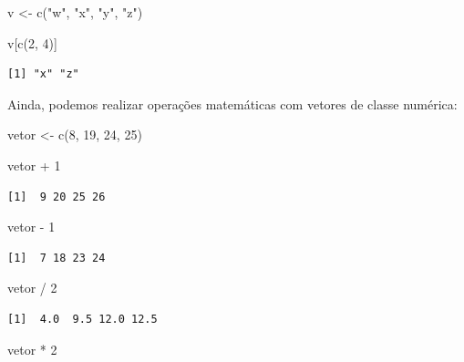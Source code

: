 \documentclass[
  brazilian,
]{book}
\newenvironment{Shaded}{\begin{snugshade}}{\end{snugshade}}
\newcommand{\DecValTok}[1]{\textcolor[rgb]{0.00,0.00,0.81}{#1}}
\newcommand{\FunctionTok}[1]{\textcolor[rgb]{0.00,0.00,0.00}{#1}}
\newcommand{\NormalTok}[1]{#1}
\newcommand{\OtherTok}[1]{\textcolor[rgb]{0.56,0.35,0.01}{#1}}
\newcommand{\SpecialCharTok}[1]{\textcolor[rgb]{0.00,0.00,0.00}{#1}}
\newcommand{\StringTok}[1]{\textcolor[rgb]{0.31,0.60,0.02}{#1}}
\begin{document}
\begin{Shaded}
\begin{Highlighting}[]
\NormalTok{v }\OtherTok{\textless{}{-}} \FunctionTok{c}\NormalTok{(}\StringTok{"w"}\NormalTok{, }\StringTok{"x"}\NormalTok{, }\StringTok{"y"}\NormalTok{, }\StringTok{"z"}\NormalTok{)}

\NormalTok{v[}\FunctionTok{c}\NormalTok{(}\DecValTok{2}\NormalTok{, }\DecValTok{4}\NormalTok{)]}
\end{Highlighting}
\end{Shaded}

\begin{verbatim}
[1] "x" "z"
\end{verbatim}

Ainda, podemos realizar operações matemáticas com vetores de classe numérica:

\begin{Shaded}
\begin{Highlighting}[]
\NormalTok{vetor }\OtherTok{\textless{}{-}} \FunctionTok{c}\NormalTok{(}\DecValTok{8}\NormalTok{, }\DecValTok{19}\NormalTok{, }\DecValTok{24}\NormalTok{, }\DecValTok{25}\NormalTok{)}

\NormalTok{vetor }\SpecialCharTok{+} \DecValTok{1}
\end{Highlighting}
\end{Shaded}

\begin{verbatim}
[1]  9 20 25 26
\end{verbatim}

\begin{Shaded}
\begin{Highlighting}[]
\NormalTok{vetor }\SpecialCharTok{{-}} \DecValTok{1}
\end{Highlighting}
\end{Shaded}

\begin{verbatim}
[1]  7 18 23 24
\end{verbatim}

\begin{Shaded}
\begin{Highlighting}[]
\NormalTok{vetor }\SpecialCharTok{/} \DecValTok{2}
\end{Highlighting}
\end{Shaded}

\begin{verbatim}
[1]  4.0  9.5 12.0 12.5
\end{verbatim}

\begin{Shaded}
\begin{Highlighting}[]
\NormalTok{vetor }\SpecialCharTok{*} \DecValTok{2}
\end{Highlighting}
\end{Shaded}
\end{document}
